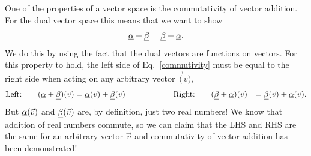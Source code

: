 \documentclass{article}
\begin{document}
\color{spoilerwhite}
One of the properties of a vector space is the commutativity of vector addition.  For the dual vector space this means that we want to show
	\begin{equation}
		\underline{\alpha} + \underline{\beta} = \underline{\beta}+\underline{\alpha}.
	\label{commutivity}
	\end{equation}
We do this by using the fact that the dual vectors are functions on vectors.  For this property to hold, the left side of Eq.~\ref{commutivity} must be equal
to the right side when acting on any arbitrary vector $\vec(v)$,
	\begin{alignat*}{5}
		\textrm{Left:} &&\quad (\underline{\alpha}+\underline{\beta})(\vec{v}) &= \underline{\alpha}(\vec{v})+\underline{\beta}(\vec{v})\qquad\qquad\qquad
		\textrm{Right:} &&\quad (\underline{\beta} + \underline{\alpha})(\vec{v}) &= \underline{\beta}(\vec{v})+\underline{\alpha}(\vec{v}).
	\end{alignat*}
But $\underline{\alpha}(\vec{v})$ and $\underline{\beta}(\vec{v})$ are, by definition, just two real numbers!  We know that addition of real numbers commute, so we can claim that 
the LHS and RHS are the same for an arbitrary vector $\vec{v}$ and commutativity of vector addition has been demonstrated!
\color{black}


\addfooter
\end{document}
